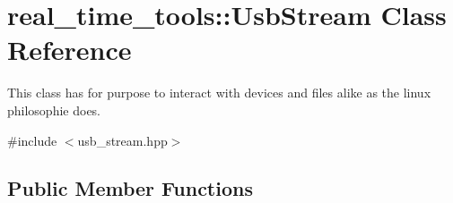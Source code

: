 \hypertarget{classreal__time__tools_1_1UsbStream}{}\section{real\+\_\+time\+\_\+tools\+:\+:Usb\+Stream Class Reference}
\label{classreal__time__tools_1_1UsbStream}


This class has for purpose to interact with devices and files alike as the linux philosophie does.  




{\ttfamily \#include $<$usb\+\_\+stream.\+hpp$>$}

\subsection*{Public Member Functions}
